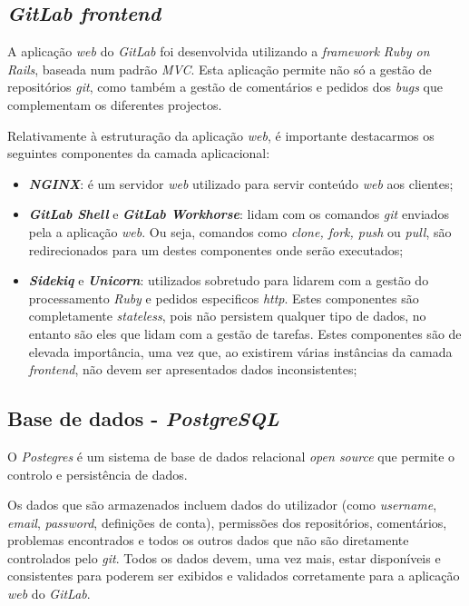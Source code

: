 \documentclass[12pt,a4paper]{article}
\begin{document}
\newpage
\subsection{\emph{GitLab frontend}}
A aplicação \emph{web} do \emph{GitLab} foi desenvolvida utilizando a \emph{framework} \emph{Ruby on Rails}, baseada num padrão \emph{MVC}. Esta aplicação permite não só a gestão de repositórios \emph{git}, como também a gestão de comentários e pedidos dos \emph{bugs} que complementam os diferentes projectos.

Relativamente à estruturação da aplicação \emph{web}, é importante destacarmos os seguintes componentes da camada aplicacional:

\begin{itemize}
    \item \emph{\textbf{NGINX}}: é um servidor \emph{web} utilizado para servir conteúdo \emph{web} aos clientes;
    \item \emph{\textbf{GitLab Shell}} e \emph{\textbf{GitLab Workhorse}}: lidam com os comandos \emph{git} enviados pela a aplicação \emph{web}. Ou seja, comandos como \emph{clone, fork, push} ou \emph{pull}, são redirecionados para um destes componentes onde serão executados;
    \item \emph{\textbf{Sidekiq}} e \emph{\textbf{Unicorn}}: utilizados sobretudo para lidarem com a gestão do processamento \emph{Ruby} e pedidos especificos \emph{http}. Estes componentes são completamente \emph{stateless}, pois não persistem qualquer tipo de dados, no entanto são eles que lidam com a gestão de tarefas. Estes componentes são de elevada importância, uma vez que, ao existirem várias instâncias da camada \emph{frontend}, não devem ser apresentados dados inconsistentes;
\end{itemize}


\subsection{Base de dados - \emph{PostgreSQL}}
O \emph{Postegres} é um sistema de base de dados relacional \emph{open source} que permite o controlo e  persistência de dados.

Os dados que são armazenados incluem dados do utilizador (como \emph{username}, \emph{email}, \emph{password}, definições de conta), permissões dos repositórios, comentários, problemas encontrados e todos os outros dados que não são diretamente controlados pelo \emph{git}. Todos os dados devem, uma vez mais, estar disponíveis e consistentes para poderem ser exibidos e validados corretamente para a aplicação \emph{web} do \emph{GitLab}.
\end{document}
